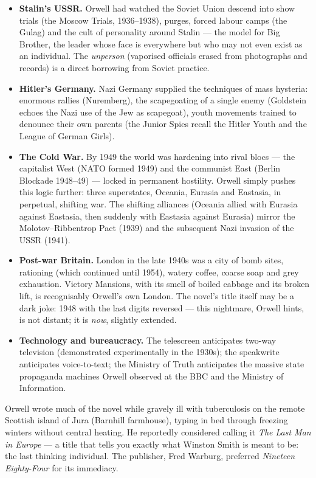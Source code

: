 \documentclass[11pt]{article}
\newcommand{\cle}[1]{{\popxbold\color{popdark}#1}}
\begin{document}
\begin{itemize}
\item \textbf{Stalin's USSR.} Orwell had watched the Soviet Union descend into show trials (the Moscow Trials, 1936--1938), purges, forced labour camps (the Gulag) and the cult of personality around Stalin --- the model for \cle{Big Brother}, the leader whose face is everywhere but who may not even exist as an individual. The \emph{unperson} (vaporised officials erased from photographs and records) is a direct borrowing from Soviet practice.
\item \textbf{Hitler's Germany.} Nazi Germany supplied the techniques of mass hysteria: enormous rallies (Nuremberg), the scapegoating of a single enemy (Goldstein echoes the Nazi use of the Jew as scapegoat), youth movements trained to denounce their own parents (the \cle{Junior Spies} recall the Hitler Youth and the League of German Girls).
\item \textbf{The Cold War.} By 1949 the world was hardening into rival blocs --- the capitalist West (NATO formed 1949) and the communist East (Berlin Blockade 1948--49) --- locked in permanent hostility. Orwell simply pushes this logic further: three superstates, \cle{Oceania}, \cle{Eurasia} and \cle{Eastasia}, in perpetual, shifting war. The shifting alliances (Oceania allied with Eurasia against Eastasia, then suddenly with Eastasia against Eurasia) mirror the Molotov--Ribbentrop Pact (1939) and the subsequent Nazi invasion of the USSR (1941).
\item \textbf{Post-war Britain.} London in the late 1940s was a city of bomb sites, rationing (which continued until 1954), watery coffee, coarse soap and grey exhaustion. Victory Mansions, with its smell of boiled cabbage and its broken lift, is recognisably Orwell's own London. The novel's title itself may be a dark joke: 1948 with the last digits reversed --- this nightmare, Orwell hints, is not distant; it is \emph{now}, slightly extended.
\item \textbf{Technology and bureaucracy.} The telescreen anticipates two-way television (demonstrated experimentally in the 1930s); the speakwrite anticipates voice-to-text; the Ministry of Truth anticipates the massive state propaganda machines Orwell observed at the BBC and the Ministry of Information.
\end{itemize}

\begin{savaistu}
Orwell wrote much of the novel while gravely ill with tuberculosis on the remote Scottish island of Jura (Barnhill farmhouse), typing in bed through freezing winters without central heating. He reportedly considered calling it \emph{The Last Man in Europe} --- a title that tells you exactly what Winston Smith is meant to be: the last thinking individual. The publisher, Fred Warburg, preferred \emph{Nineteen Eighty-Four} for its immediacy.
\end{savaistu}
\end{document}
